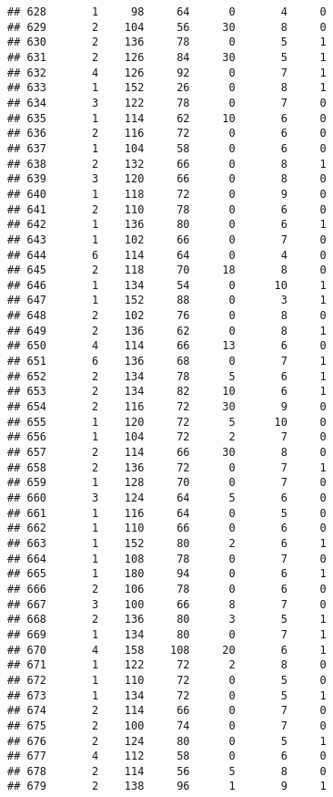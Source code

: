 \documentclass[
]{article}
\begin{document}
\begin{verbatim}
## 628       1     98     64      0       4     0
## 629       2    104     56     30       8     0
## 630       2    136     78      0       5     1
## 631       2    126     84     30       5     1
## 632       4    126     92      0       7     1
## 633       1    152     26      0       8     1
## 634       3    122     78      0       7     0
## 635       1    114     62     10       6     0
## 636       2    116     72      0       6     0
## 637       1    104     58      0       6     0
## 638       2    132     66      0       8     1
## 639       3    120     66      0       8     0
## 640       1    118     72      0       9     0
## 641       2    110     78      0       6     0
## 642       1    136     80      0       6     1
## 643       1    102     66      0       7     0
## 644       6    114     64      0       4     0
## 645       2    118     70     18       8     0
## 646       1    134     54      0      10     1
## 647       1    152     88      0       3     1
## 648       2    102     76      0       8     0
## 649       2    136     62      0       8     1
## 650       4    114     66     13       6     0
## 651       6    136     68      0       7     1
## 652       2    134     78      5       6     1
## 653       2    134     82     10       6     1
## 654       2    116     72     30       9     0
## 655       1    120     72      5      10     0
## 656       1    104     72      2       7     0
## 657       2    114     66     30       8     0
## 658       2    136     72      0       7     1
## 659       1    128     70      0       7     0
## 660       3    124     64      5       6     0
## 661       1    116     64      0       5     0
## 662       1    110     66      0       6     0
## 663       1    152     80      2       6     1
## 664       1    108     78      0       7     0
## 665       1    180     94      0       6     1
## 666       2    106     78      0       6     0
## 667       3    100     66      8       7     0
## 668       2    136     80      3       5     1
## 669       1    134     80      0       7     1
## 670       4    158    108     20       6     1
## 671       1    122     72      2       8     0
## 672       1    110     72      0       5     0
## 673       1    134     72      0       5     1
## 674       2    114     66      0       7     0
## 675       2    100     74      0       7     0
## 676       2    124     80      0       5     1
## 677       4    112     58      0       6     0
## 678       2    114     56      5       8     0
## 679       2    138     96      1       9     1

\end{verbatim}
\end{document}
